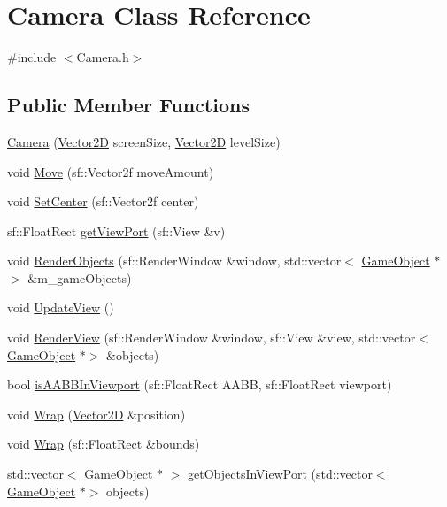 \hypertarget{class_camera}{}\section{Camera Class Reference}
\label{class_camera}


{\ttfamily \#include $<$Camera.\+h$>$}

\subsection*{Public Member Functions}
\begin{DoxyCompactItemize}
\item 
\hyperlink{class_camera_a52482616d4b8612775a639292303828d}{Camera} (\hyperlink{class_vector2_d}{Vector2D} screen\+Size, \hyperlink{class_vector2_d}{Vector2D} level\+Size)
\item 
void \hyperlink{class_camera_a2b7f120e90a5dc351ed44acf4af49729}{Move} (sf\+::\+Vector2f move\+Amount)
\item 
void \hyperlink{class_camera_a202fc4aff11dc17b8db71b5528c8476a}{Set\+Center} (sf\+::\+Vector2f center)
\item 
sf\+::\+Float\+Rect \hyperlink{class_camera_a77f821b5003fad8f5050ba802dd667e8}{get\+View\+Port} (sf\+::\+View \&v)
\item 
void \hyperlink{class_camera_a4795eceabe4768f35007dcb0083d418e}{Render\+Objects} (sf\+::\+Render\+Window \&window, std\+::vector$<$ \hyperlink{class_game_object}{Game\+Object} $\ast$$>$ \&m\+\_\+game\+Objects)
\item 
void \hyperlink{class_camera_a0b31de4a23f304be6e27d53706d326c5}{Update\+View} ()
\item 
void \hyperlink{class_camera_aadd889d41e7856d1c00609a7823c031f}{Render\+View} (sf\+::\+Render\+Window \&window, sf\+::\+View \&view, std\+::vector$<$ \hyperlink{class_game_object}{Game\+Object} $\ast$$>$ \&objects)
\item 
bool \hyperlink{class_camera_a8058d6b1c91c5d3ec5e410e5d0890737}{is\+A\+A\+B\+B\+In\+Viewport} (sf\+::\+Float\+Rect A\+A\+BB, sf\+::\+Float\+Rect viewport)
\item 
void \hyperlink{class_camera_aca617187658f1cea7f9633b4f62f1e93}{Wrap} (\hyperlink{class_vector2_d}{Vector2D} \&position)
\item 
void \hyperlink{class_camera_ad2f98f35c9a25c335ce7c5e6beae1ff9}{Wrap} (sf\+::\+Float\+Rect \&bounds)
\item 
std\+::vector$<$ \hyperlink{class_game_object}{Game\+Object} $\ast$ $>$ \hyperlink{class_camera_a8143cba00af1c4fca71d9597ebb0c748}{get\+Objects\+In\+View\+Port} (std\+::vector$<$ \hyperlink{class_game_object}{Game\+Object} $\ast$$>$ objects)
\end{DoxyCompactItemize}


